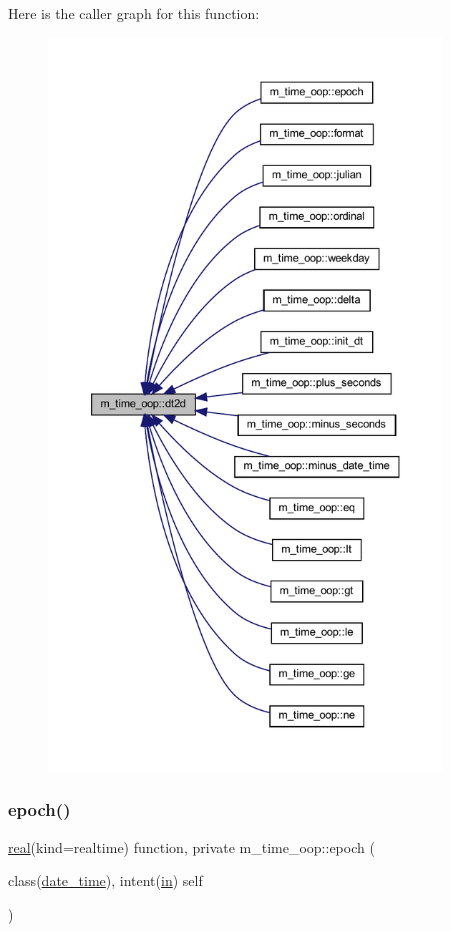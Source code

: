 Here is the caller graph for this function\+:
\nopagebreak
\begin{figure}[H]
\begin{center}
\leavevmode
\includegraphics[height=550pt]{namespacem__time__oop_ac68405e5566d5aec59cd1fba7145130c_icgraph}
\end{center}
\end{figure}
\mbox{\label{namespacem__time__oop_a50cb1ad3024b3b44b004382323bea7a9}} 
\subsubsection{\texorpdfstring{epoch()}{epoch()}}
{\footnotesize\ttfamily \hyperlink{read__watch_83_8txt_abdb62bde002f38ef75f810d3a905a823}{real}(kind=realtime) function, private m\+\_\+time\+\_\+oop\+::epoch (\begin{DoxyParamCaption}\item[{class(\hyperlink{structm__time__oop_1_1date__time}{date\+\_\+time}), intent(\hyperlink{M__journal_83_8txt_afce72651d1eed785a2132bee863b2f38}{in})}]{self }\end{DoxyParamCaption})\hspace{0.3cm}{\ttfamily [private]}}



